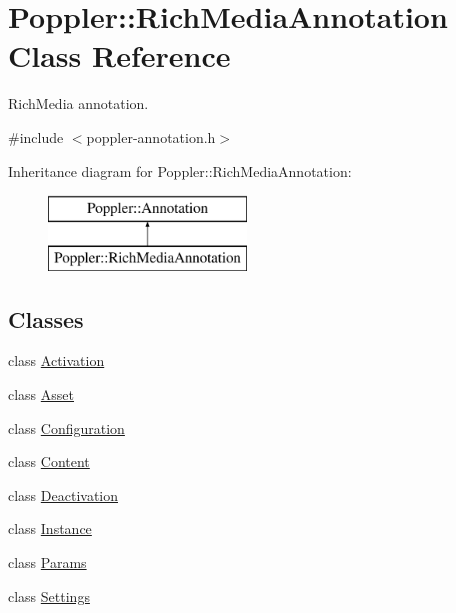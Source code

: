 \hypertarget{class_poppler_1_1_rich_media_annotation}{}\section{Poppler\+:\+:Rich\+Media\+Annotation Class Reference}
\label{class_poppler_1_1_rich_media_annotation}


Rich\+Media annotation.  




{\ttfamily \#include $<$poppler-\/annotation.\+h$>$}

Inheritance diagram for Poppler\+:\+:Rich\+Media\+Annotation\+:\begin{figure}[H]
\begin{center}
\leavevmode
\includegraphics[height=2.000000cm]{class_poppler_1_1_rich_media_annotation}
\end{center}
\end{figure}
\subsection*{Classes}
\begin{DoxyCompactItemize}
\item 
class \hyperlink{class_poppler_1_1_rich_media_annotation_1_1_activation}{Activation}
\item 
class \hyperlink{class_poppler_1_1_rich_media_annotation_1_1_asset}{Asset}
\item 
class \hyperlink{class_poppler_1_1_rich_media_annotation_1_1_configuration}{Configuration}
\item 
class \hyperlink{class_poppler_1_1_rich_media_annotation_1_1_content}{Content}
\item 
class \hyperlink{class_poppler_1_1_rich_media_annotation_1_1_deactivation}{Deactivation}
\item 
class \hyperlink{class_poppler_1_1_rich_media_annotation_1_1_instance}{Instance}
\item 
class \hyperlink{class_poppler_1_1_rich_media_annotation_1_1_params}{Params}
\item 
class \hyperlink{class_poppler_1_1_rich_media_annotation_1_1_settings}{Settings}
\end{DoxyCompactItemize}
